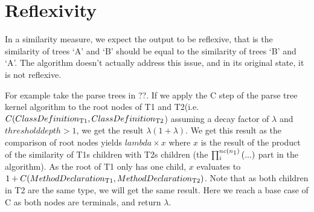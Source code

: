 \section{Reflexivity}
In a similarity measure, we expect the output to be reflexive, that is the similarity of trees `A' and `B' should be equal to the similarity of trees `B' and `A'. The algorithm doesn’t actually address this issue, and in its original state, it is not reflexive.

For example take the parse trees in ??. If we apply the C step of the parse tree kernel algorithm to the root nodes of T1 and T2(i.e. 
$C(ClassDefinition\textsubscript{T1},ClassDefinition\textsubscript{T2}$) assuming a decay factor of $\lambda$ and $threshold depth > 1$, we get the result $\lambda(1 + \lambda)$. 
We get this result as the comparison of root nodes yields 
$lambda \times x$ where $x$ is the result of the product of the similarity of T1s children
with T2s children (the $\prod_{i}^{nc(n\textsubscript{1})}{(...)}$ part in the algorithm). 
As the root of T1 only has one child, $x$ evaluates to
$1 + C(MethodDeclaration\textsubscript{T1}, MethodDeclaration\textsubscript{T2})$. Note that as both
children in T2 are the same type, we will get the same result. Here we reach
a base case of C as both nodes are terminals, and return $\lambda$.

